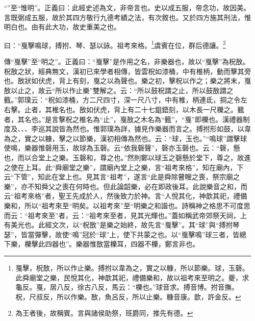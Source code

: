 {\noindent\shu{}\fzkt “”至“惟明”。正義曰：此經史述為文，非帝言也。史以成五服，帝念功，故因美。言既弼成五服，故於其四方敬行九德考績之法，有次敘也。又於四方施其刑法，惟明白也。由有此大功，故史重美之也。 \par}

曰：“戛擊鳴球，搏拊、琴、瑟以詠。祖考來格。\footnote{戛擊，柷敔，所以作止樂。搏拊以韋為之，實之以糠，所以節樂。球，玉磬。此舜廟堂之樂，民悅其化，神歆其祀，禮備樂和，故以祖考來至明之。夔，求龜反。戛，居八反，徐古八反，馬云：“櫟也。”球音求。搏音博。拊音撫。柷，尺叔反，所以作樂。敔，魚呂反，所以止樂。糠音康。歆，許金反。}虞賓在位，群后德讓。\footnote{為王者後，故稱賓。言與諸侯助祭，班爵同，推先有德。}


{\noindent\zhuan{}\fzbyks 傳“戛擊”至“明之”。正義曰：“戛擊”是作用之名，非樂器也，故以“戛擊”為柷敔。柷敔之狀，經典無文，漢初已來學者相傳，皆雲柷如漆桶，中有椎柄，動而擊其旁也。敔狀如伏虎，背上有刻，戛之以為聲也。樂之初，擊柷以作之；樂之將末，戛敔以止之，故云“所以作止樂”雙解之。云：“所以鼓柷謂之止，所以鼓敔謂之籈。”郭璞云：“柷如漆桶，方二尺四寸，深一尺八寸，中有椎，柄連氐，挏之令左右擊。止者，其椎名也。敔如伏虎，背上有二十七鉏鋙刻，以木長一尺櫟之。籈者，其名也。”是言擊柷之椎名為“止”，戛敔之木名為“籈”，“戛”即櫟也。漢禮器制度及、、、李巡其說皆為然也。惟郭璞為詳，據見作樂器而言之。搏拊形如鼓，以韋為之，實之以糠，擊之以節樂，漢初相傳為然也。云：“球，玉也。”“鳴球”謂擊球使鳴，樂器惟磬用玉，故球為玉磬。云“依我磬聲”，磬亦玉磬也。云：“磬，懸也，而以合堂上之樂。玉磬和，尊之也。”然則鄭以球玉之磬懸於堂下，尊之，故進之使在上耳。此“舜廟堂之樂”，謂廟內堂上之樂，言“祖考來格”，知在廟內，下云“下管”，知此在堂上也。見其言“祖考”，遂言“此是舜除瞽瞍之喪，祭宗廟之樂”，亦不知舜父之喪在何時也。但此論韶樂，必在即政後耳。此說樂音之和，而云“祖考來格”者，聖王先成於人，然後致力於神。言“人悅其化，神歆其祀，禮備樂和，所以“祖考來至“明矣。以祖考來”至“明樂之和諧也。詩稱神之格思不可度思而云：“祖考來至”者，云：“祖考來至者，見其光輝也。”蓋如稱武帝郊祭天祠，上有美光也。此經文次，以“柷敔”是樂之始終，故先言“戛擊”。其“球”與“搏拊琴瑟”，皆當彈擊，故使“鳴”冠於“球”上，使下共蒙之也。以“戛擊鳴”球三者，皆總下樂，櫟擊此四器也”。樂器惟敔當櫟耳，四器不櫟，鄭言非也。 \par}

